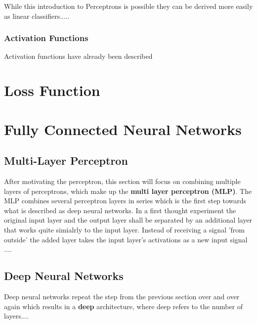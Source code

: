 


While this introduction to Perceptrons is possible they can be derived more easily as linear classifiers.....


\subsubsection{Activation Functions}
Activation functions have already been described 

\section{Loss Function}

\section{Fully Connected Neural Networks}
\subsection{Multi-Layer Perceptron}



After motivating the perceptron, this section will focus on combining multiple layers of perceptrons, which make up the \textbf{multi layer perceptron (MLP)}.
The MLP combines several perceptron layers in series which is the first step towards what is described as deep neural networks.
In a first thought experiment the original input layer and the output layer shall be separated by an additional layer that works quite simialrly to the input layer.
Instead of receiving a signal 'from outside' the added layer takes the input layer's activations as a new input signal ....


\subsection{Deep Neural Networks}
Deep neural networks repeat the step from the previous section over and over again which results in a \textbf{deep} architecture, where deep refers to the number of layers....


